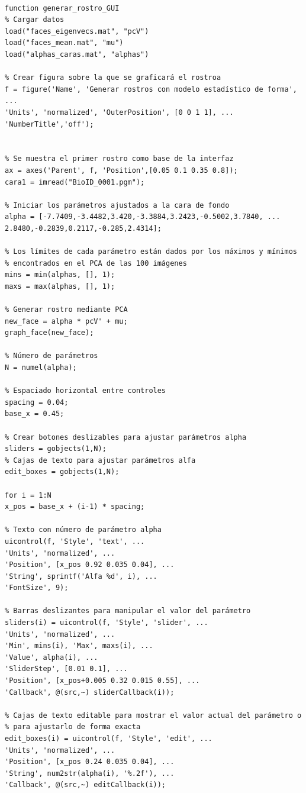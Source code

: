 \documentclass[11pt, letterpaper]{article}
\begin{document}
\begin{verbatim}

function generar_rostro_GUI
% Cargar datos
load("faces_eigenvecs.mat", "pcV")
load("faces_mean.mat", "mu")
load("alphas_caras.mat", "alphas")

% Crear figura sobre la que se graficará el rostroa
f = figure('Name', 'Generar rostros con modelo estadístico de forma', ...
'Units', 'normalized', 'OuterPosition', [0 0 1 1], ...
'NumberTitle','off');


% Se muestra el primer rostro como base de la interfaz
ax = axes('Parent', f, 'Position',[0.05 0.1 0.35 0.8]);
cara1 = imread("BioID_0001.pgm");

% Iniciar los parámetros ajustados a la cara de fondo
alpha = [-7.7409,-3.4482,3.420,-3.3884,3.2423,-0.5002,3.7840, ...
2.8480,-0.2839,0.2117,-0.285,2.4314];

% Los límites de cada parámetro están dados por los máximos y mínimos
% encontrados en el PCA de las 100 imágenes
mins = min(alphas, [], 1);
maxs = max(alphas, [], 1);

% Generar rostro mediante PCA
new_face = alpha * pcV' + mu;
graph_face(new_face);

% Número de parámetros
N = numel(alpha);

% Espaciado horizontal entre controles
spacing = 0.04;
base_x = 0.45;

% Crear botones deslizables para ajustar parámetros alpha
sliders = gobjects(1,N);
% Cajas de texto para ajustar parámetros alfa
edit_boxes = gobjects(1,N);

for i = 1:N
x_pos = base_x + (i-1) * spacing;

% Texto con número de parámetro alpha
uicontrol(f, 'Style', 'text', ...
'Units', 'normalized', ...
'Position', [x_pos 0.92 0.035 0.04], ...
'String', sprintf('Alfa %d', i), ...
'FontSize', 9);

% Barras deslizantes para manipular el valor del parámetro 
sliders(i) = uicontrol(f, 'Style', 'slider', ...
'Units', 'normalized', ...
'Min', mins(i), 'Max', maxs(i), ...
'Value', alpha(i), ...
'SliderStep', [0.01 0.1], ...
'Position', [x_pos+0.005 0.32 0.015 0.55], ...
'Callback', @(src,~) sliderCallback(i));

% Cajas de texto editable para mostrar el valor actual del parámetro o 
% para ajustarlo de forma exacta
edit_boxes(i) = uicontrol(f, 'Style', 'edit', ...
'Units', 'normalized', ...
'Position', [x_pos 0.24 0.035 0.04], ...
'String', num2str(alpha(i), '%.2f'), ...
'Callback', @(src,~) editCallback(i));


\end{verbatim}
\end{document}
